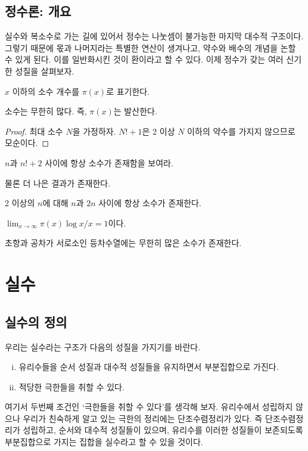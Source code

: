 \section{정수론: 개요}
실수와 복소수로 가는 길에 있어서 정수는 나눗셈이 불가능한 마지막 대수적 구조이다. 그렇기 때문에 몫과 나머지라는 특별한 연산이 생겨나고, 약수와 배수의 개념을 논할 수 있게 된다. 이를 일반화시킨 것이 환이라고 할 수 있다. 이제 정수가 갖는 여러 신기한 성질을 살펴보자. 
\begin{definition}
    $x$ 이하의 소수 개수를 $\pi(x)$로 표기한다. 
\end{definition}
\begin{theorem}[Euclid]
    소수는 무한히 많다. 즉, $\pi(x)$는 발산한다. 
\end{theorem}
\begin{proof}
    최대 소수 $N$을 가정하자. $N!+1$은 2 이상 $N$ 이하의 약수를 가지지 않으므로 모순이다. 
\end{proof}
\begin{exercise}
    $n$과 $n!+2$ 사이에 항상 소수가 존재함을 보여라. 
\end{exercise}
물론 더 나은 결과가 존재한다. 
\begin{theorem}
    2 이상의 $n$에 대해 $n$과 $2n$ 사이에 항상 소수가 존재한다.
\end{theorem}
\begin{theorem}\label{thm:pnt}
    $\lim_{x\to \infty} \pi(x)\log x/x=1$이다. 
\end{theorem}
\begin{theorem}
초항과 공차가 서로소인 등차수열에는 무한히 많은 소수가 존재한다. 
\end{theorem}

\chapter{실수}
\section{실수의 정의}
우리는 실수라는 구조가 다음의 성질을 가지기를 바란다.
\begin{enumerate}[(i)]
    \item 유리수들을 순서 성질과 대수적 성질들을 유지하면서 부분집합으로 가진다.
    \item 적당한 극한들을 취할 수 있다.
\end{enumerate}
여기서 두번째 조건인 `극한들을 취할 수 있다'를 생각해 보자.
유리수에서 성립하지 않으나 우리가 친숙하게 알고 있는 극한의 정리에는 단조수렴정리가 있다.
즉 단조수렴정리가 성립하고, 순서와 대수적 성질들이 있으며, 유리수를 이러한 성질들이 보존되도록 부분집합으로 가지는 집합을 실수라고 할 수 있을 것이다.

